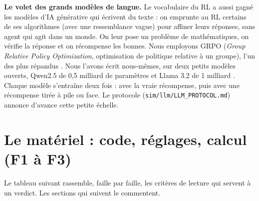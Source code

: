 \documentclass[11pt,a4paper]{article}
\begin{document}
\textbf{Le volet des grands modèles de langue.} Le vocabulaire du RL a
aussi gagné les modèles d'IA générative qui écrivent du texte : on
emprunte au RL certains de ses algorithmes (avec une ressemblance vague)
pour affiner leurs réponses, sans agent qui agit dans un monde. On leur
pose un problème de mathématiques, on vérifie la réponse et on
récompense les bonnes. Nous employons GRPO (\emph{Group Relative Policy
Optimization}, optimisation de politique relative à un groupe), l'un des
plus répandus \autocite{shao2024deepseekmath}. Nous l'avons écrit
nous-mêmes, sur deux petits modèles ouverts, Qwen2.5 de 0,5 milliard de
paramètres \autocite{qwen2025qwen25} et Llama 3.2 de 1 milliard
\autocite{meta2024llama32,grattafiori2024llama3}. Chaque modèle
s'entraîne deux fois : avec la vraie récompense, puis avec une
récompense tirée à pile ou face. Le protocole
(\texttt{sim/llm/LLM\_PROTOCOL.md}) annonce d'avance cette petite
échelle.

\section{Le matériel : code, réglages, calcul (F1 à
F3)}\label{le-matuxe9riel-code-ruxe9glages-calcul-f1-uxe0-f3}

Le tableau suivant rassemble, faille par faille, les critères de lecture
qui servent à un verdict. Les sections qui suivent le commentent.
\end{document}
